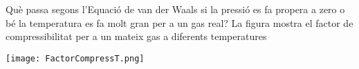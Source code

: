 \begin{exr}
Què passa segons l'Equació de van der Waals si la pressió es fa propera a zero o bé la temperatura es fa molt gran per a un gas real?   La figura mostra el factor de compressibilitat per a un mateix gas a diferents temperatures
\begin{center}        \texttt{[image: FactorCompressT.png]}
\end{center}
\end{exr}